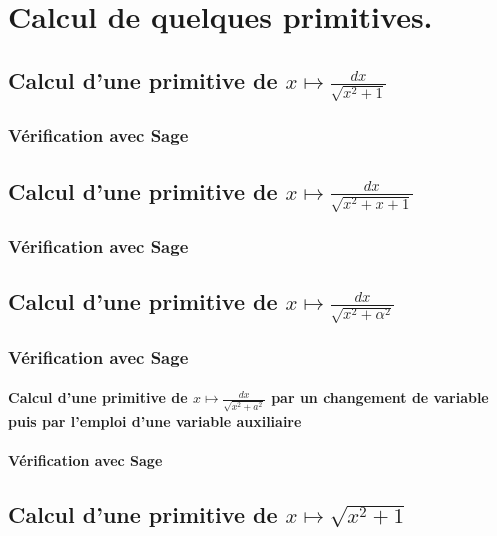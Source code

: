 \documentclass[a4paper,14pt]{extreport} %
\begin{document}
\chapter{Calcul de quelques primitives.}


\section{Calcul d'une primitive de $ x \longmapsto  \frac{dx}{\sqrt{x^2 + 1} } $ }

\subsection{Vérification avec Sage}

\section{Calcul d'une primitive de $  x \longmapsto  \frac{dx}{\sqrt{x^2+ x + 1} } $ }

\subsection{Vérification avec Sage}

\section{Calcul d'une primitive de $  x \longmapsto  \frac{dx}{\sqrt{x^2+ \alpha^2} } $ }

\subsection{Vérification avec Sage}



\subsubsection{Calcul d'une primitive de $  x \longmapsto  \frac{dx}{\sqrt{x^2+ a^2} } $ par un changement de variable puis par l'emploi d'une variable auxiliaire} 

\subsubsection{Vérification avec Sage}

\section{Calcul d'une primitive de $  x \longmapsto  \sqrt{x^2 + 1}  $ \label{sqrt-001} }
\end{document}
